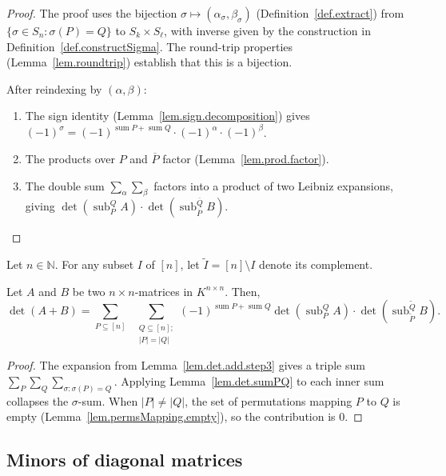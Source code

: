 \begin{proof}
\leanok
The proof uses the bijection
$\sigma \mapsto (\alpha_{\sigma}, \beta_{\sigma})$
(Definition~\ref{def.extract})
from $\{\sigma\in S_n : \sigma(P) = Q\}$ to $S_k \times S_{\ell}$,
with inverse given by the construction in
Definition~\ref{def.constructSigma}.
The round-trip properties (Lemma~\ref{lem.roundtrip})
establish that this is a bijection.

After reindexing by $(\alpha,\beta)$:
\begin{enumerate}
\item The sign identity (Lemma~\ref{lem.sign.decomposition}) gives
  $(-1)^{\sigma} = (-1)^{\operatorname{sum} P+\operatorname{sum} Q}
  \cdot (-1)^{\alpha}\cdot (-1)^{\beta}$.
\item The products over $P$ and $\overline{P}$ factor
  (Lemma~\ref{lem.prod.factor}).
\item The double sum
  $\sum_{\alpha}\sum_{\beta}$ factors into a product of two Leibniz
  expansions, giving
  $\det(\operatorname{sub}_P^Q A)\cdot
   \det(\operatorname{sub}_{\overline{P}}^{\overline{Q}} B)$.
\end{enumerate}
\end{proof}

\begin{theorem}
\label{thm.det.det(A+B)}
\leantarget
\leanok
Let $n\in\mathbb{N}$. For any subset $I$ of $[n]$, let
$\widetilde{I} = [n]\setminus I$ denote its complement.

Let $A$ and $B$ be two $n\times n$-matrices in $K^{n\times n}$. Then,
\[
\det(A+B) = \sum_{P\subseteq [n]}\;\;
\sum_{\substack{Q\subseteq [n];\\ |P|=|Q|}}
(-1)^{\operatorname{sum} P + \operatorname{sum} Q}
\det(\operatorname{sub}_P^Q A)
\cdot \det(\operatorname{sub}_{\widetilde{P}}^{\widetilde{Q}} B).
\]
\end{theorem}

\begin{proof}
The expansion from Lemma~\ref{lem.det.add.step3} gives a triple sum
$\sum_P \sum_Q \sum_{\sigma:\sigma(P)=Q}$.
Applying Lemma~\ref{lem.det.sumPQ} to each inner sum collapses the
$\sigma$-sum. When $|P| \ne |Q|$, the set of permutations mapping
$P$ to $Q$ is empty (Lemma~\ref{lem.permsMapping.empty}),
so the contribution is $0$.
\end{proof}

\subsection{Minors of diagonal matrices}

